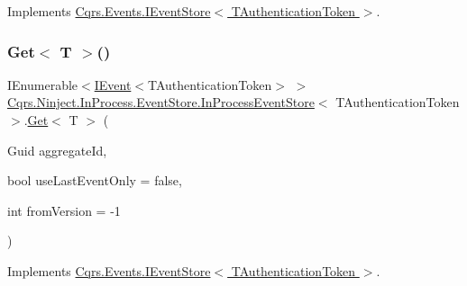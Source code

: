 Implements \hyperlink{interfaceCqrs_1_1Events_1_1IEventStore_af398bb6768fa661ad97a9fa9ecfbd9fb}{Cqrs.\+Events.\+I\+Event\+Store$<$ T\+Authentication\+Token $>$}.

\mbox{\label{classCqrs_1_1Ninject_1_1InProcess_1_1EventStore_1_1InProcessEventStore_a154f3f96109d63a3bf442a72c1bb0525}} 
\subsubsection{\texorpdfstring{Get$<$ T $>$()}{Get< T >()}}
{\footnotesize\ttfamily I\+Enumerable$<$\hyperlink{interfaceCqrs_1_1Events_1_1IEvent}{I\+Event}$<$T\+Authentication\+Token$>$ $>$ \hyperlink{classCqrs_1_1Ninject_1_1InProcess_1_1EventStore_1_1InProcessEventStore}{Cqrs.\+Ninject.\+In\+Process.\+Event\+Store.\+In\+Process\+Event\+Store}$<$ T\+Authentication\+Token $>$.\hyperlink{classCqrs_1_1Ninject_1_1InProcess_1_1EventStore_1_1InProcessEventStore_a45144027681fe901b1f0db3de9dc7b21}{Get}$<$ T $>$ (\begin{DoxyParamCaption}\item[{Guid}]{aggregate\+Id,  }\item[{bool}]{use\+Last\+Event\+Only = {\ttfamily false},  }\item[{int}]{from\+Version = {\ttfamily -\/1} }\end{DoxyParamCaption})}



Implements \hyperlink{interfaceCqrs_1_1Events_1_1IEventStore_add6227e2978ff8656aad79b1a51bf34c}{Cqrs.\+Events.\+I\+Event\+Store$<$ T\+Authentication\+Token $>$}.

\mbox{\label{classCqrs_1_1Ninject_1_1InProcess_1_1EventStore_1_1InProcessEventStore_a21816423f7b71249f3dc7ce14952e1e5}} 
